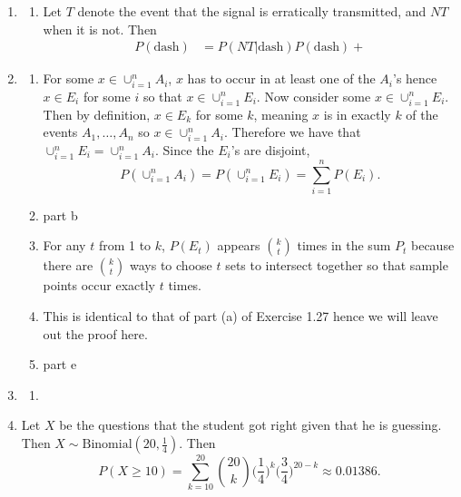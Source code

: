 \documentclass{article}
\begin{document}
\begin{enumerate}
    \item \begin{enumerate}
        \item Let $T$ denote the event that the signal is erratically transmitted, and $NT$ when
        it is not. Then
        \begin{align*}
            P(\text{dash})
            &= P(NT|\text{dash})P(\text{dash}) +
        \end{align*}
    \end{enumerate}

    \item \begin{enumerate}
        \item For some $x \in \cup_{i = 1}^{n} A_i$, $x$ has to occur in at least one of the 
        $A_i$'s hence $x \in E_i$ for some $i$ so that $x \in \cup_{i = 1}^{n} E_i$. Now 
        consider some $x \in \cup_{i = 1}^{n} E_i$. Then by definition, $x \in E_k$ for 
        some $k$, meaning $x$ is in exactly $k$ of the events $A_1, \dots, A_n$ so 
        $x \in \cup_{i = 1}^{n} A_i$. Therefore we have that 
        $\cup_{i = 1}^{n} E_i = \cup_{i = 1}^{n} A_i$. Since the $E_i$'s are disjoint, 
        \[ P(\cup_{i = 1}^{n} A_i) = P(\cup_{i = 1}^{n} E_i) = \sum_{i = 1}^{n} P(E_i). \]

        \item part b

        \item For any $t$ from 1 to $k$, $P(E_t)$ appears $\binom{k}{t}$ times in the sum 
        $P_t$ because there are $\binom{k}{t}$ ways to choose $t$ sets to intersect together 
        so that sample points occur exactly $t$ times.

        \item This is identical to that of part (a) of Exercise 1.27 hence we will leave out 
        the proof here.

        \item part e
    \end{enumerate}

    \item \begin{enumerate}
        \item 
    \end{enumerate}

    \item Let $X$ be the questions that the student got right given that he is guessing. Then 
    $X \sim \text{Binomial}(20, \frac{1}{4})$. Then
    \[ P(X \geq 10) = \sum_{k = 10}^{20} \binom{20}{k} \Big( \frac{1}{4} \Big)^{k} 
    \Big( \frac{3}{4} \Big)^{20 - k} \approx 0.01386. \]


\end{enumerate}
\end{document}
